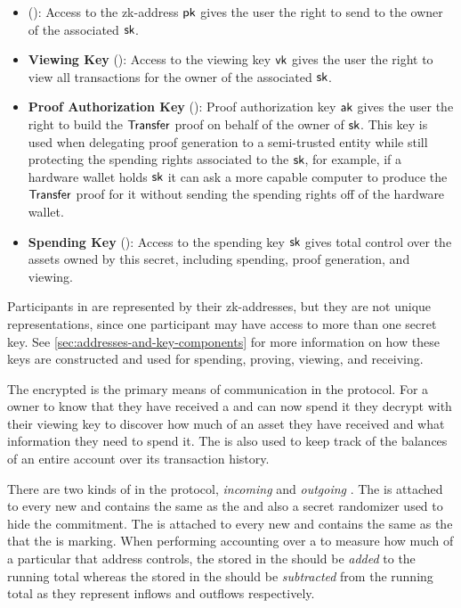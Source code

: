 \begin{itemize}
    \item \textbf{\zkAddress{}} (\send{}): Access to the zk-address ${\textsf{pk}}$ gives the user the right to send  to the owner of the associated ${\textsf{sk}}$. 
    \item \textbf{Viewing Key} (\view{}): Access to the viewing key ${\textsf{vk}}$ gives the user the right to view all transactions for the owner of the associated ${\textsf{sk}}$.
    \item \textbf{Proof Authorization Key} (\prove{}): Proof authorization key ${\textsf{ak}}$ gives the user the right to build the ${\textsf{Transfer}}$ proof on behalf of the owner of ${\textsf{sk}}$. This key is used when delegating proof generation to a semi-trusted entity while still protecting the spending rights associated to the ${\textsf{sk}}$, for example, if a hardware wallet holds ${\textsf{sk}}$ it can ask a more capable computer to produce the ${\textsf{Transfer}}$ proof for it without sending the spending rights off of the hardware wallet.
    \item \textbf{Spending Key} (\spend{}): Access to the spending key ${\textsf{sk}}$ gives total control over the assets owned by this secret, including spending, proof generation, and viewing.
\end{itemize}

Participants in \MantaPay{} are represented by their zk-addresses, but they are not unique representations, since one participant may have access to more than one secret key. See \autoref{sec:addresses-and-key-components} for more information on how these keys are constructed and used for spending, proving, viewing, and receiving.


The encrypted \Note{} is the primary means of communication in the \MantaPay{} protocol. For a \zkAddress{} owner to know that they have received a \zkAsset{} and can now spend it they decrypt  with their viewing key to discover how much of an asset they have received and what information they need to spend it. The \Note{} is also used to keep track of the balances of an entire account over its transaction history.

There are two kinds of  in the \MantaPay{} protocol, \emph{incoming}  and \emph{outgoing} . The \IncomingNote{} is attached to every new \UTXO{} and contains the same \zkAsset{} as the \UTXO{} and also a secret randomizer used to hide the \UTXO{} commitment. The \OutgoingNote{} is attached to every new \Nullifier{} and contains the same \zkAsset{} as the \UTXO{} that the \Nullifier{} is marking. When performing accounting over a \zkAddress{} to measure how much of a particular \AssetId{} that address controls, the \AssetValue{} stored in the  should be \emph{added} to the running total whereas the \AssetValue{} stored in the  should be \emph{subtracted} from the running total as they represent inflows and outflows respectively.

